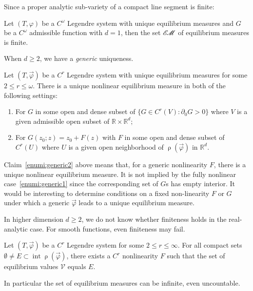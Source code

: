 \documentclass[10pt]{amsart}
\theoremstyle{definition}\newtheorem{defi}[theo]{Definition}\newtheorem{rema}[theo]{Remark}\newtheorem{exam}[theo]{Example}\newtheorem{exem}[theo]{Example}\newtheorem{nota}[theo]{Notation}
\theoremstyle{plain}
\theoremstyle{plain}
\newcommand\vpot{\vec\pot}
\DeclareMathOperator{\interior}{int}
\newcommand{\rs}{\operatorname{\rho}}
\newcommand{\EM}{\mathscr{E\kern-2pt M}}
\newcommand{\pot}{\varphi}
\newcounter{In}
\newcommand*\8{\infty}
\newcommand\RR{\mathbb{R}}
\newcommand{\scV}{\mathscr{V}}
\newcommand*{\romanenumi}{\renewcommand*{\theenumi}{\roman{enumi}}}
\begin{document}
Since a proper analytic sub-variety of a compact line segment is finite:

\begin{coro}\label{cor-finite-1D}
Let $(T,\pot)$ be a $C^\omega$ Legendre system with unique equilibrium measures and $G$ be a $C^\omega$ admissible function with $d=1$, then the set $\EM$ of equilibrium measures is finite.
\end{coro}

When $d\ge2$, we have a \emph{generic} uniqueness.

\begin{prop}\label{p-generic-unique}
Let $(T, \vpot)$ be a $C^r$ Legendre system with unique equilibrium measures for some $2\leq r\leq\omega$. There is a unique nonlinear equilibrium measure in both of the following settings:
\begin{enumerate}\romanenumi
\item\label{enumi:generic1}
For $G$ in some open and dense subset of $\{G\in C^r(V):\partial_0 G>0\}$ where $V$ is a given admissible open subset of $\RR\times\RR^d$;
\item\label{enumi:generic2}
For $G(z_0;z)=z_0+F(z)$ with $F$ in some open and dense subset of $C^r(U)$ where $U$ is a given open neighborhood of $\rs(\vpot)$ in $\RR^d$.
\end{enumerate}
\end{prop}

Claim~\eqref{enumi:generic2} above means that, for a generic nonlinearity $F$, there is a unique nonlinear equilibrium measure. It is not implied by the fully nonlinear case~\eqref{enumi:generic1} since the corresponding set of $G$s has empty interior. It would be interesting to determine conditions on a fixed non-linearity $F$ or $G$ under which a generic $\vpot$ leads to a unique equilibrium measure.


In higher dimension $d\ge 2$, we do not know whether finiteness holds in the real-analytic case. For smooth functions, even finiteness may fail.


\begin{prop}\label{prop-flexibility}
Let $(T, \vpot)$ be a {$C^r$ Legendre system} for some $2\leq r\leq\infty$. For all compact sets $\emptyset\ne E\subset\interior \rs(\vpot)$, there exists a $C^r$ nonlinearity $F$ such that the set of equilibrium values $\scV$ equals $E$.

In particular the set of equilibrium measures can be infinite, even uncountable.
\end{prop}
\end{document}
